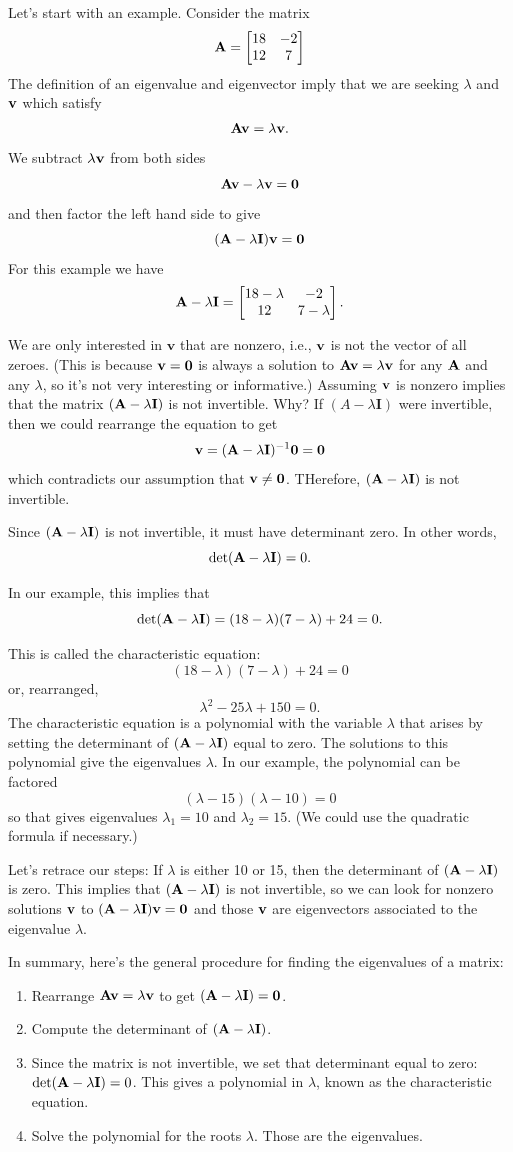Let's start with an example. Consider the matrix
\[ \mathbf{A} = \begin{bmatrix} 18 & -2 \\ 12 & 7\end{bmatrix} \]
The definition of an eigenvalue and eigenvector imply that we are seeking $\lambda$ and $\mathbf{v}$ which satisfy
\[ \mathbf{A} \mathbf{v} = \lambda \mathbf{v}. \]
We subtract $\lambda \mathbf{v}$ from both sides
\[ \mathbf{A} \mathbf{v} - \lambda \mathbf{v} = \mathbf{0} \]
and then factor the left hand side to give
\[ (\mathbf{A} - \lambda \mathbf{I}) \mathbf{v} = \mathbf{0} \]
For this example we have
\[ \mathbf{A} - \lambda \mathbf{I} = \begin{bmatrix} 18-\lambda & -2 \\ 12 & 7-\lambda\end{bmatrix}. \]

We are only interested in $\mathbf{v}$ that are nonzero, i.e., $\mathbf{v}$ is not the vector of all zeroes. (This is because $\mathbf{v}=\mathbf{0}$ is always a solution to $\mathbf{A}\mathbf{v}=\lambda\mathbf{v}$ for any $\mathbf{A}$ and any $\lambda$, so it's not very interesting or informative.) Assuming $\mathbf{v}$ is nonzero implies that the matrix $(\mathbf{A} - \lambda\mathbf{I})$ is not invertible. Why? If $(A-\lambda\mathbf{I})$ were invertible, then we could rearrange the equation to get
$$\mathbf{v} = (\mathbf{A} - \lambda\mathbf{I})^{-1}\mathbf{0} = \mathbf{0}$$
which contradicts our assumption that $\mathbf{v}\neq\mathbf{0}$. THerefore, $(\mathbf{A} - \lambda \mathbf{I})$ is not invertible.

Since $(\mathbf{A} - \lambda \mathbf{I})$ is not invertible, it must have determinant zero. In other words,
\[\det(\mathbf{A} - \lambda \mathbf{I}) = 0. \]

In our example, this implies that
\[ \det(\mathbf{A} - \lambda \mathbf{I}) = (18-\lambda)(7 - \lambda) + 24 =0.\]

This is called the characteristic equation:
\[ (18-\lambda)(7 - \lambda) + 24 = 0 \]
or, rearranged,
\[\lambda^2 - 25 \lambda + 150 = 0.\]
The characteristic equation is a polynomial with the variable $\lambda$ that arises by setting the determinant of $(\mathbf{A}-\lambda\mathbf{I})$ equal to zero. The solutions to this polynomial give the eigenvalues $\lambda$. In our example, the polynomial can be factored
\[(\lambda - 15)(\lambda - 10) = 0 \]
so that gives eigenvalues $\lambda_1 = 10$ and $\lambda_2 = 15$. (We could use the quadratic formula if necessary.)

Let's retrace our steps: If $\lambda$ is either 10 or 15, then the determinant of $(\mathbf{A} - \lambda\mathbf{I})$ is zero. This implies that $(\mathbf{A} - \lambda\mathbf{I})$ is not invertible, so we can look for nonzero solutions $\mathbf{v}$ to $(\mathbf{A} - \lambda\mathbf{I})\mathbf{v} = \mathbf{0}$ and those $\mathbf{v}$ are eigenvectors associated to the eigenvalue $\lambda$.

In summary, here's the general procedure for finding the eigenvalues of a matrix:
\begin{enumerate}
    \item Rearrange $\mathbf{A}\mathbf{v}=\lambda\mathbf{v}$ to get $(\mathbf{A}-\lambda\mathbf{I})=\mathbf{0}$.
    \item Compute the determinant of $(\mathbf{A}-\lambda\mathbf{I})$. 
    \item Since the matrix is not invertible, we set that determinant equal to zero: $\det(\mathbf{A}-\lambda\mathbf{I})=0$. This gives a polynomial in $\lambda$, known as the characteristic equation.
    \item Solve the polynomial for the roots $\lambda$. Those are the eigenvalues.
    
\end{enumerate}

